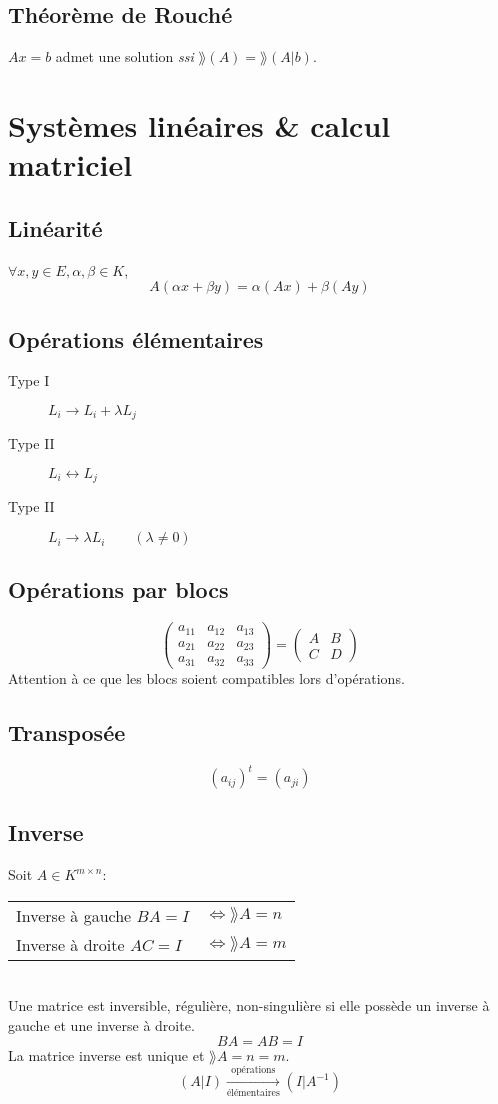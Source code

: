 \subsection{Théorème de Rouché}
$Ax = b$ admet une solution \emph{ssi} $\rang(A) = \rang(A | b)$.


\section{Systèmes linéaires \& calcul matriciel}

\subsection{Linéarité}
$\forall x,y \in{E}, \alpha, \beta \in{K}$,
\[  A(\alpha{x} + \beta{y}) = \alpha{(Ax)} + \beta{(Ay)} \]
\subsection{Opérations élémentaires}
\begin{description}
  \item[Type I] $L_i \rightarrow L_i + \lambda{L_j}$
  \item[Type II] $L_i \leftrightarrow L_j$
  \item[Type II] $L_i \rightarrow \lambda{L_i} \qquad{(\lambda \neq 0)}$
\end{description}
\subsection{Opérations par blocs}
\[
  \left(
  \begin{array}{cc|c}
    a_{11} & a_{12} & a_{13} \\
    \hline
    a_{21} & a_{22} & a_{23} \\
    a_{31} & a_{32} & a_{33}
  \end{array}
  \right)
  = \begin{pmatrix}
    A&B \\
    C&D
  \end{pmatrix}
 \]
Attention à ce que les blocs soient compatibles lors d'opérations.

\subsection{Transposée}
\[  (a_{ij})^t = (a_{ji})  \]

\subsection{Inverse}
Soit $A\in K^{m \times n}$:\\
\begin{tabular}{ll}
  Inverse à gauche $BA = I$ & $\Leftrightarrow \rang A  = n$\\
  Inverse à droite $AC = I$ & $\Leftrightarrow \rang A  = m$
\end{tabular}\\
Une matrice est inversible, régulière, non-singulière si elle possède un inverse à gauche et une inverse à droite.
\[ BA = AB = I \]
La matrice inverse est unique et $\rang A = n = m$.
\[ (A|I) \xrightarrow[\textrm{élémentaires}]{\textrm{opérations}} (I|A^{-1}) \]

